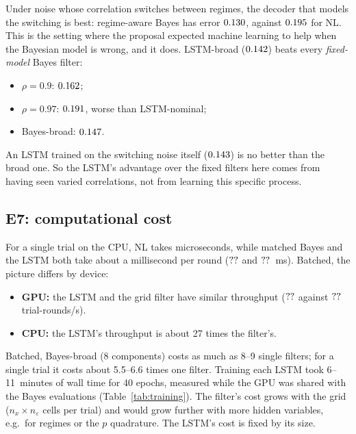 \begin{table}[H]
\centering\small

\caption{E6: switching noise (20{,}000 trials, common noise).}
\label{tab:e6}
\end{table}

Under noise whose correlation switches between regimes, the decoder that
models the switching is best: regime-aware Bayes has error
$0.130$, against $0.195$ for NL. This is the
setting where the proposal expected machine learning to help when the
Bayesian model is wrong, and it does. LSTM-broad ($0.142$) beats
every \emph{fixed-model} Bayes filter:
\begin{itemize}
  \item $\rho=0.9$: $0.162$;
  \item $\rho=0.97$: $0.191$, worse than LSTM-nominal;
  \item Bayes-broad: $0.147$.
\end{itemize}
An LSTM trained on the switching noise itself ($0.143$) is
no better than the broad one. So the LSTM's advantage over the fixed filters
here comes from having seen varied correlations, not from learning this
specific process.

\subsection{E7: computational cost}

\begin{table}[H]
\centering\small

\caption{E7: decoding cost per round, measured on an otherwise idle
\GPUname{} and the host CPU. Batch 1 gives the latency of one decoder instance;
the large batch gives throughput.}
\label{tab:e7}
\end{table}

For a single trial on the CPU, NL takes microseconds, while matched Bayes and
the LSTM both take about a millisecond per round
($\tim{Bayes (matched)}{cpu}{1}{latency}$ and
$\tim{LSTM-nominal s0}{cpu}{1}{latency}$~ms). Batched, the picture differs by
device:
\begin{itemize}
  \item \textbf{GPU:} the LSTM and the grid filter have similar throughput
    ($\tim{LSTM-nominal s0}{cuda}{4096}{throughput}$ against
    $\tim{Bayes (matched)}{cuda}{4096}{throughput}$ trial-rounds/s).
  \item \textbf{CPU:} the LSTM's throughput is about 27 times the filter's.
\end{itemize}
Batched, Bayes-broad (8 components) costs as much as 8--9 single filters; for
a single trial it costs about 5.5--6.6 times one filter. Training each LSTM
took 6--11~minutes of wall time for 40 epochs, measured while the GPU was
shared with the Bayes evaluations (Table~\ref{tab:training}). The filter's cost grows with
the grid ($n_x\times n_\varepsilon$ cells per trial) and would grow further
with more hidden variables, e.g.\ for regimes or the $p$ quadrature. The
LSTM's cost is fixed by its size.
